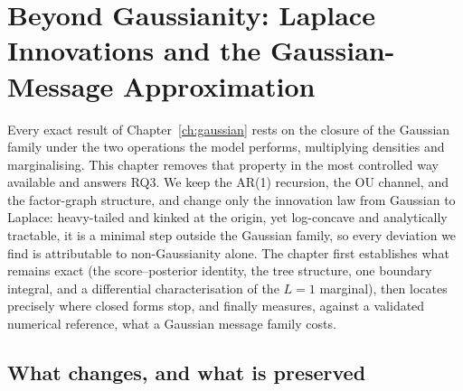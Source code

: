 \chapter{Beyond Gaussianity: Laplace Innovations and the Gaussian-Message
Approximation}\label{ch:laplace}\label{sec:bp-nongaussian}

Every exact result of Chapter~\ref{ch:gaussian} rests on the closure of
the Gaussian family under the two operations the model performs,
multiplying densities and marginalising. This chapter removes that
property in the most controlled way available and answers RQ3. We keep
the AR(1) recursion, the OU channel, and the factor-graph structure, and
change only the innovation law from Gaussian to Laplace: heavy-tailed and
kinked at the origin, yet log-concave and analytically tractable, it is a
minimal step outside the Gaussian family, so every deviation we find is
attributable to non-Gaussianity alone. The chapter first establishes what
remains exact (the score--posterior identity, the tree structure, one
boundary integral, and a differential characterisation of the $L=1$
marginal), then locates precisely where closed forms stop, and finally
measures, against a validated numerical reference, what a Gaussian
message family costs.

\section{What changes, and what is preserved}\label{sec:l-model}

